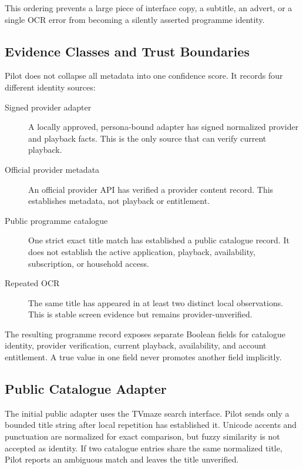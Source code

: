 This ordering prevents a large piece of interface copy, a subtitle, an advert,
or a single OCR error from becoming a silently asserted programme identity.

\subsection{Evidence Classes and Trust Boundaries}

Pilot does not collapse all metadata into one confidence score. It records four
different identity sources:

\begin{description}
  \item[Signed provider adapter] A locally approved, persona-bound adapter has
        signed normalized provider and playback facts. This is the only source
        that can verify current playback.
  \item[Official provider metadata] An official provider API has verified a
        provider content record. This establishes metadata, not playback or
        entitlement.
  \item[Public programme catalogue] One strict exact title match has established
        a public catalogue record. It does not establish the active application,
        playback, availability, subscription, or household access.
  \item[Repeated OCR] The same title has appeared in at least two distinct local
        observations. This is stable screen evidence but remains provider-unverified.
\end{description}

The resulting programme record exposes separate Boolean fields for catalogue
identity, provider verification, current playback, availability, and account
entitlement. A true value in one field never promotes another field implicitly.

\subsection{Public Catalogue Adapter}

The initial public adapter uses the TVmaze search interface. Pilot sends only a
bounded title string after local repetition has established it. Unicode accents
and punctuation are normalized for exact comparison, but fuzzy similarity is not
accepted as identity. If two catalogue entries share the same normalized title,
Pilot reports an ambiguous match and leaves the title unverified.

